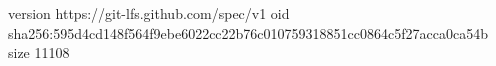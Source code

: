 version https://git-lfs.github.com/spec/v1
oid sha256:595d4cd148f564f9ebe6022cc22b76c010759318851cc0864c5f27acca0ca54b
size 11108
